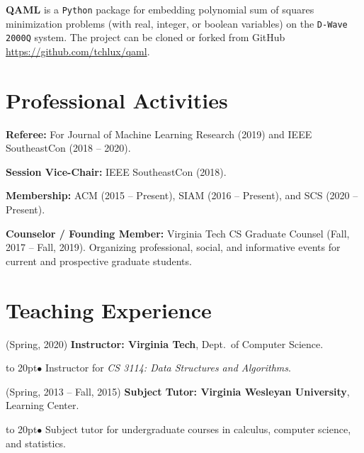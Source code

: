\documentclass[12pt]{article}
\def\bullitem{\par\hangindent=15pt \hangafter=1
\noindent\hbox to 20pt{\hfil$\bullet$\hfil}\ignorespaces}
\begin{document}
\textbf{QAML} is a \texttt{Python} package for embedding polynomial sum of
squares minimization problems (with real, integer, or boolean variables) on
the \texttt{D-Wave 2000Q} system.
The project can be cloned or forked from GitHub
\url{https://github.com/tchlux/qaml}.


\section*{Professional Activities}

\textbf{Referee:} For
Journal of Machine Learning Research (2019) and
IEEE SoutheastCon (2018 -- 2020).

\textbf{Session Vice-Chair:} IEEE SoutheastCon (2018).

\textbf{Membership:} ACM (2015 -- Present), SIAM (2016 -- Present), and
SCS (2020 -- Present).

\textbf{Counselor / Founding Member:} Virginia Tech CS Graduate Counsel 
(Fall, 2017 -- Fall, 2019).
Organizing professional, social, and informative events for
current and prospective graduate students.

\section*{Teaching Experience}

(Spring, 2020)
\textbf{Instructor: Virginia Tech}, Dept.\ of Computer Science.
\bullitem
Instructor for {\it CS 3114: Data Structures and Algorithms}.

\medskip

(Spring, 2013 -- Fall, 2015)
\textbf{Subject Tutor: Virginia Wesleyan University}, Learning Center.
\bullitem
Subject tutor for undergraduate courses in calculus, computer science, and
statistics.
\end{document}
